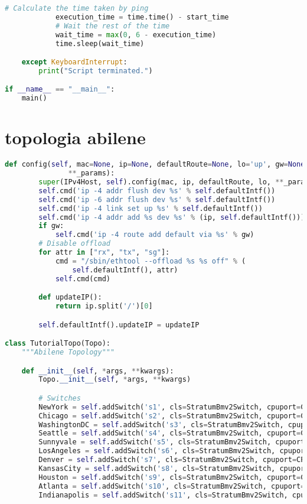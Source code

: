 \begin{lstlisting}[language=Python]
            # Calculate the time taken by ping
            execution_time = time.time() - start_time
            # Wait the rest of the time
            wait_time = max(0, 6 - execution_time)
            time.sleep(wait_time)

    except KeyboardInterrupt:
        print("Script terminated.")

if __name__ == "__main__":
    main()
\end{lstlisting}
\section{topologia abilene}
\begin{lstlisting}[language=Python]
    def config(self, mac=None, ip=None, defaultRoute=None, lo='up', gw=None,
               **_params):
        super(IPv4Host, self).config(mac, ip, defaultRoute, lo, **_params)
        self.cmd('ip -4 addr flush dev %s' % self.defaultIntf())
        self.cmd('ip -6 addr flush dev %s' % self.defaultIntf())
        self.cmd('ip -4 link set up %s' % self.defaultIntf())
        self.cmd('ip -4 addr add %s dev %s' % (ip, self.defaultIntf()))
        if gw:
            self.cmd('ip -4 route add default via %s' % gw)
        # Disable offload
        for attr in ["rx", "tx", "sg"]:
            cmd = "/sbin/ethtool --offload %s %s off" % (
                self.defaultIntf(), attr)
            self.cmd(cmd)

        def updateIP():
            return ip.split('/')[0]

        self.defaultIntf().updateIP = updateIP

class TutorialTopo(Topo):
    """Abilene Topology"""

    def __init__(self, *args, **kwargs):
        Topo.__init__(self, *args, **kwargs)

        # Switches
        NewYork = self.addSwitch('s1', cls=StratumBmv2Switch, cpuport=CPU_PORT)
        Chicago = self.addSwitch('s2', cls=StratumBmv2Switch, cpuport=CPU_PORT)
        WashingtonDC = self.addSwitch('s3', cls=StratumBmv2Switch, cpuport=CPU_PORT)
        Seattle = self.addSwitch('s4', cls=StratumBmv2Switch, cpuport=CPU_PORT)
        Sunnyvale = self.addSwitch('s5', cls=StratumBmv2Switch, cpuport=CPU_PORT)
        LosAngeles = self.addSwitch('s6', cls=StratumBmv2Switch, cpuport=CPU_PORT)
        Denver = self.addSwitch('s7', cls=StratumBmv2Switch, cpuport=CPU_PORT)
        KansasCity = self.addSwitch('s8', cls=StratumBmv2Switch, cpuport=CPU_PORT)
        Houston = self.addSwitch('s9', cls=StratumBmv2Switch, cpuport=CPU_PORT)
        Atlanta = self.addSwitch('s10', cls=StratumBmv2Switch, cpuport=CPU_PORT)
        Indianapolis = self.addSwitch('s11', cls=StratumBmv2Switch, cpuport=CPU_PORT)



\end{lstlisting}
